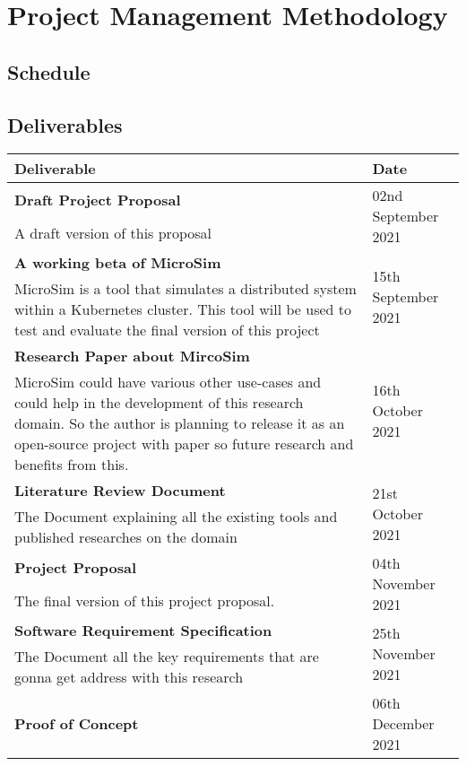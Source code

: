 
{\let\clearpage\relax \chapter{Project Management Methodology}}

\section{Schedule}

\section{Deliverables}


\begin{longtable}{|p{11cm}|p{3.5cm}|}
\hline
\textbf{Deliverable} & \textbf{Date} \\ \hline
\textbf{Draft Project Proposal} & \multirow{2}{*}{02nd September 2021} \\
A draft version of this proposal &  \\ \hline
\textbf{A working beta of MicroSim}\label{microsim} & \multirow{2}{*}{15th September 2021} \\
MicroSim is a tool that simulates a distributed system within a Kubernetes cluster. This tool will be used to test and evaluate the final version of this project &  \\ \hline
\textbf{Research Paper about MircoSim} & \multirow{2}{*}{16th October 2021} \\
MicroSim could have various other use-cases and could help in the development of this research domain. So the author is planning to release it as an open-source project with paper so future research and benefits from this. &  \\ \hline
\textbf{Literature Review Document} & \multirow{2}{*}{21st October 2021} \\
The Document explaining all the existing tools and published researches on the domain &  \\ \hline
\textbf{Project Proposal} & \multirow{2}{*}{04th November 2021} \\
The final version of this project proposal. &  \\ \hline
\textbf{Software Requirement Specification} & \multirow{2}{*}{25th November 2021} \\
The Document all the key requirements that are gonna get address with this research &  \\ \hline
\textbf{Proof of Concept} & \multirow{2}{*}{06th December 2021} \\

\end{longtable}
